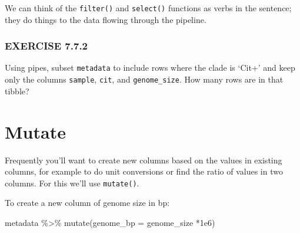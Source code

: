 \documentclass[
]{book}
\newenvironment{Shaded}{\begin{snugshade}}{\end{snugshade}}
\newcommand{\AttributeTok}[1]{\textcolor[rgb]{0.77,0.63,0.00}{#1}}
\newcommand{\FloatTok}[1]{\textcolor[rgb]{0.00,0.00,0.81}{#1}}
\newcommand{\FunctionTok}[1]{\textcolor[rgb]{0.00,0.00,0.00}{#1}}
\newcommand{\NormalTok}[1]{#1}
\newcommand{\SpecialCharTok}[1]{\textcolor[rgb]{0.00,0.00,0.00}{#1}}
\begin{document}
We can think of the \texttt{filter()} and \texttt{select()} functions as verbs in the sentence; they do things to the data flowing through the pipeline.

\hypertarget{exercise-7.7.2}{%
\subsubsection*{EXERCISE 7.7.2}\label{exercise-7.7.2}}

Using pipes, subset \texttt{metadata} to include rows where the clade is `Cit+' and keep only the columns \texttt{sample}, \texttt{cit}, and \texttt{genome\_size}.
How many rows are in that tibble?

\hypertarget{mutate}{%
\section{Mutate}\label{mutate}}

Frequently you'll want to create new columns based on the values in existing columns, for example to do unit conversions or find the ratio of values in two columns. For this we'll use \texttt{mutate()}.

To create a new column of genome size in bp:

\begin{Shaded}
\begin{Highlighting}[]
\NormalTok{metadata }\SpecialCharTok{\%\textgreater{}\%}
  \FunctionTok{mutate}\NormalTok{(}\AttributeTok{genome\_bp =}\NormalTok{ genome\_size }\SpecialCharTok{*}\FloatTok{1e6}\NormalTok{)}
\end{Highlighting}
\end{Shaded}
\end{document}
